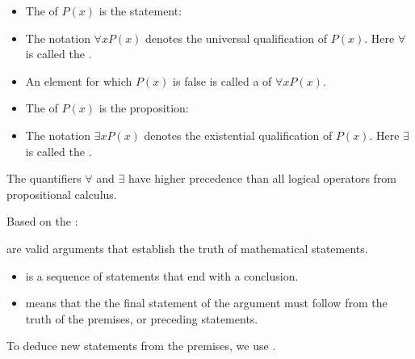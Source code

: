       \begin{itemize}
        \item The  of $P(x)$ is the statement: \\
        \item The notation $\forall x P(x)$ denotes the universal qualification of
          $P(x)$. Here $\forall$ is called the .
        \item An element for which $P(x)$ is false is called a 
          of $\forall x P(x)$.
      \end{itemize}
      \begin{itemize}
        \item The  of $P(x)$ is the proposition: \\
        \item The notation $\exists x P(x)$ denotes the existential qualification of
          $P(x)$. Here $\exists$ is called the .
      \end{itemize}
      \par The quantifiers $\forall$ and $\exists$ have higher precedence than all
        logical operators from propositional calculus.
      \par Based on the :
  \hiiEND

\pagebreak


\pagebreak

    \par {} are valid arguments that establish the truth of mathematical
    statements.
    \begin{itemize}
      \item {} is a sequence of statements that end with a conclusion.
      \item {} means that the the final statement of the argument must follow
        from the truth of the premises, or preceding statements.
    \end{itemize}
    \par To deduce new statements from the premises, we use .

